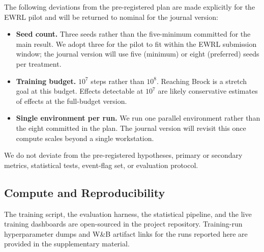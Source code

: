 The following deviations from the pre-registered plan are made
explicitly for the EWRL pilot and will be returned to nominal for the
journal version:
%
\begin{itemize}
\item \textbf{Seed count.}  Three seeds rather than the
  five-minimum committed for the main result.  We adopt three for the
  pilot to fit within the EWRL submission window; the journal version
  will use five (minimum) or eight (preferred) seeds per treatment.
\item \textbf{Training budget.}  $10^7$ steps rather than $10^8$.
  Reaching Brock is a stretch goal at this budget.  Effects detectable
  at $10^7$ are likely conservative estimates of effects at the
  full-budget version.
\item \textbf{Single environment per run.}  We run one parallel
  environment rather than the eight committed in the plan.  The
  journal version will revisit this once compute scales beyond a
  single workstation.
\end{itemize}
%
We do not deviate from the pre-registered hypotheses, primary or
secondary metrics, statistical tests, event-flag set, or evaluation
protocol.

\subsection{Compute and Reproducibility}
\label{sec:compute}


The training script, the evaluation harness, the statistical
pipeline, and the live training dashboards are open-sourced in the
project repository.  Training-run hyperparameter dumps and W\&B
artifact links for the runs reported here are provided in the
supplementary material.

